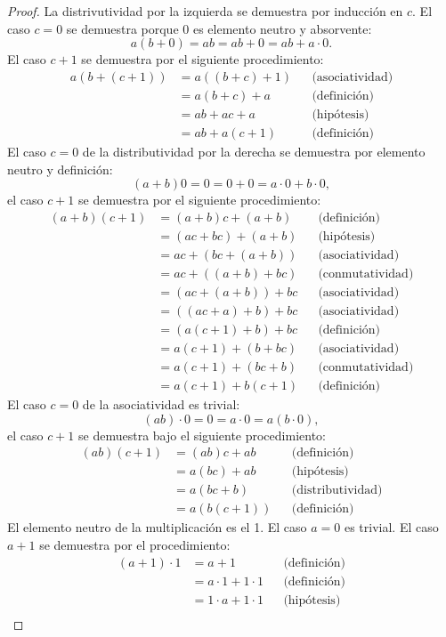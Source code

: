 \documentclass[11pt,oneside,a4paper]{book}
\begin{document}
\begin{proof}
La distrivutividad por la izquierda se demuestra por inducción en $c$. El caso $c=0$ se demuestra porque 0 es elemento neutro y absorvente:
$$a(b+0)=ab=ab+0=ab+a\cdot 0.$$
El caso $c+1$ se demuestra por el siguiente procedimiento:
$$\begin{aligned}
a(b+(c+1))&=a((b+c)+1) &&\text{(asociatividad)}\\
&=a(b+c)+a &&\text{(definición)}\\
&=ab+ac+a &&\text{(hipótesis)}\\
&=ab+a(c+1) &&\text{(definición)}
\end{aligned}$$
El caso $c=0$ de la distributividad por la derecha se demuestra por elemento neutro y definición:
$$(a+b)0=0=0+0=a\cdot 0+b\cdot 0,$$
el caso $c+1$ se demuestra por el siguiente procedimiento:
$$\begin{aligned}
(a+b)(c+1)&=(a+b)c+(a+b) &&\text{(definición)}\\
&=(ac+bc)+(a+b) &&\text{(hipótesis)}\\
&=ac+(bc+(a+b)) &&\text{(asociatividad)}\\
&=ac+((a+b)+bc) &&\text{(conmutatividad)}\\
&=(ac+(a+b))+bc &&\text{(asociatividad)}\\
&=((ac+a)+b)+bc &&\text{(asociatividad)}\\
&=(a(c+1)+b)+bc &&\text{(definición)}\\
&=a(c+1)+(b+bc) &&\text{(asociatividad)}\\
&=a(c+1)+(bc+b) &&\text{(conmutatividad)}\\
&=a(c+1)+b(c+1) &&\text{(definición)}
\end{aligned}$$
El caso $c=0$ de la asociatividad es trivial:
$$(ab)\cdot 0=0=a\cdot 0=a(b\cdot 0),$$
el caso $c+1$ se demuestra bajo el siguiente procedimiento:
$$\begin{aligned}
(ab)(c+1)&=(ab)c+ab &&\text{(definición)}\\
&=a(bc)+ab &&\text{(hipótesis)}\\
&=a(bc+b) &&\text{(distributividad)}\\
&=a(b(c+1)) &&\text{(definición)}
\end{aligned}$$
El elemento neutro de la multiplicación es el 1. El caso $a=0$ es trivial. El caso $a+1$ se demuestra por el procedimiento:
$$\begin{aligned}
(a+1)\cdot 1&=a+1 &&\text{(definición)}\\
&=a\cdot 1+1\cdot 1 &&\text{(definición)}\\
&=1\cdot a+1\cdot 1 &&\text{(hipótesis)}\\

\end{aligned}$$
\end{proof}
\end{document}
